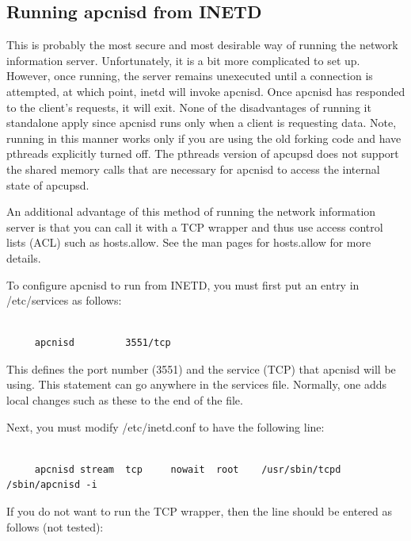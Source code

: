 {{{{{{{{{{\label{Running-apcnisd-from-INETD}

\subsection*{Running apcnisd from INETD}

This is probably the most secure and most desirable way of running the network
information server. Unfortunately, it is a bit more complicated to set up.
However, once running, the server remains unexecuted until a connection is
attempted, at which point, inetd will invoke apcnisd. Once apcnisd has
responded to the client's requests, it will exit. None of the disadvantages of
running it standalone apply since apcnisd runs only when a client is
requesting data. Note, running in this manner works only if you are using the
old forking code and have pthreads explicitly turned off. The pthreads version
of apcupsd does not support the shared memory calls that are necessary for
apcnisd to access the internal state of apcupsd.  

An additional advantage of this method of running the network information
server is that you can call it with a TCP wrapper and thus use access control
lists (ACL) such as hosts.allow. See the man pages for hosts.allow for more
details.  

To configure apcnisd to run from INETD, you must first put an entry in
/etc/services as follows: 

\footnotesize
\begin{verbatim}
     
     apcnisd         3551/tcp
\end{verbatim}
\normalsize

This defines the port number (3551) and the service (TCP) that apcnisd will be
using. This statement can go anywhere in the services file. Normally, one adds
local changes such as these to the end of the file.  

Next, you must modify /etc/inetd.conf to have the following line: 

\footnotesize
\begin{verbatim}
     
     apcnisd stream  tcp     nowait  root    /usr/sbin/tcpd  /sbin/apcnisd -i
\end{verbatim}
\normalsize

If you do not want to run the TCP wrapper, then the line should be entered as
follows (not tested): 

}}}}}}}}}}

